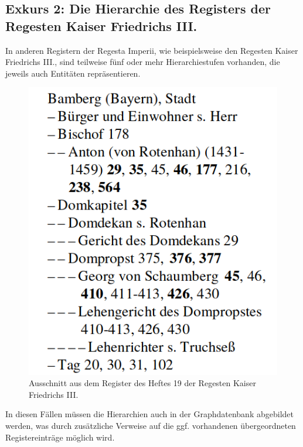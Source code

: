 \documentclass[12pt,ngerman,]{article}
\begin{document}
\subsection{Exkurs 2: Die Hierarchie des Registers der Regesten Kaiser
Friedrichs
III.}\label{exkurs-2-die-hierarchie-des-registers-der-regesten-kaiser-friedrichs-iii.}

In anderen Registern der Regesta Imperii, wie beispielsweise den
Regesten Kaiser Friedrichs III., sind teilweise fünf oder mehr
Hierarchiestufen vorhanden, die jeweils auch Entitäten repräsentieren.

\begin{figure}
\centering
\includegraphics{Bilder/RI2Graph/ReggF3-Registerhierarchie.png}
\caption{Ausschnitt aus dem Register des Heftes 19 der Regesten Kaiser
Friedrichs III.}
\end{figure}

In diesen Fällen müssen die Hierarchien auch in der Graphdatenbank
abgebildet werden, was durch zusätzliche Verweise auf die ggf.
vorhandenen übergeordneten Registereinträge möglich wird.
\end{document}
